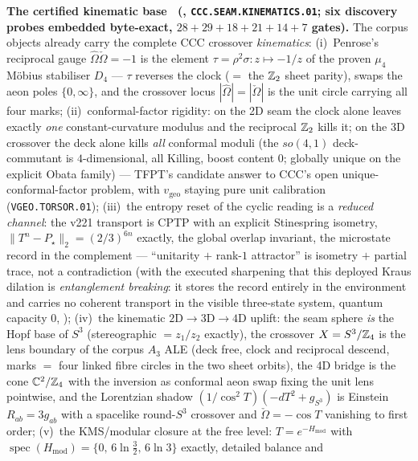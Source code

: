 \par\smallskip\noindent\textbf{The certified kinematic base \mE\ (,
\texttt{CCC.SEAM.KINEMATICS.01}; six discovery probes embedded byte-exact, $28{+}29{+}18{+}21{+}14{+}7$
gates).}  The corpus objects already carry the complete CCC crossover \emph{kinematics}:
(i)~Penrose's reciprocal gauge $\hat\Omega\check\Omega=-1$ is the element $\tau=\rho^2\sigma:
z\mapsto-1/z$ of the proven $\mu_4$ M\"obius stabiliser $D_4$ --- $\tau$ reverses the clock
($=$ the $\mathbb Z_2$ sheet parity), swaps the aeon poles $\{0,\infty\}$, and the crossover locus
$|\hat\Omega|=|\check\Omega|$ is the unit circle carrying all four marks; (ii)~conformal-factor
rigidity: on the 2D seam the clock alone leaves exactly \emph{one} constant-curvature modulus and
the reciprocal $\mathbb Z_2$ kills it; on the 3D crossover the deck alone kills \emph{all} conformal
moduli (the $so(4,1)$ deck-commutant is $4$-dimensional, all Killing, boost content $0$; globally
unique on the explicit Obata family) --- TFPT's candidate answer to CCC's open unique-conformal-factor
problem, with $v_{\mathrm{geo}}$ staying pure unit calibration (\texttt{VGEO.TORSOR.01});
(iii)~the entropy reset of the cyclic reading is a \emph{reduced channel}: the v221 transport is
CPTP with an explicit Stinespring isometry, $\|T^n-P_\star\|_2=(2/3)^{6n}$ exactly, the global
overlap invariant, the microstate record in the complement --- ``unitarity $+$ rank-$1$ attractor''
is isometry $+$ partial trace, not a contradiction (with the executed sharpening that this deployed
Kraus dilation is \emph{entanglement breaking}: it stores the record entirely in the environment and
carries no coherent transport in the visible three-state system, quantum capacity $0$,
); (iv)~the kinematic $2\mathrm D\to3\mathrm D\to
4\mathrm D$ uplift: the seam sphere \emph{is} the Hopf base of $S^3$ (stereographic $=z_1/z_2$
exactly), the crossover $X=S^3/\mathbb Z_4$ is the lens boundary of the corpus $A_3$ ALE (deck free,
clock and reciprocal descend, marks $=$ four linked fibre circles in the two sheet orbits), the
4D bridge is the cone $\mathbb C^2/\mathbb Z_4$ with the inversion as conformal aeon swap fixing the unit
lens pointwise, and the Lorentzian shadow $(1/\cos^2T)(-dT^2+g_{S^3})$ is Einstein $R_{ab}=3g_{ab}$
with a spacelike round-$S^3$ crossover and $\check\Omega=-\cos T$ vanishing to first order;
(v)~the KMS/modular closure at the free level: $T=e^{-H_{\mathrm{mod}}}$ with
$\operatorname{spec}(H_{\mathrm{mod}})=\{0,\,6\ln\tfrac32,\,6\ln3\}$ exactly, detailed balance and
